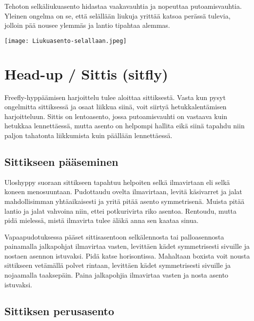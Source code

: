 Tehoton selkäliukuasento hidastaa vaakavauhtia ja nopeuttaa putoamisvauhtia. Yleinen ongelma on se, että selällään liukuja yrittää katsoa perässä tulevia, jolloin pää nousee ylemmäs ja lantio tipahtaa alemmas. 


\begin{Figure}\centering\texttt{[image: Liukuasento-selallaan.jpeg]}\end{Figure} 

\section{ Head-up / Sittis (sitfly) }
\label{freefly-lentoasennot-head-up-sittis-sitfly}


Freefly-hyppäämisen harjoittelu tulee aloittaa sittiksestä. Vasta kun pysyt ongelmitta sittiksessä ja osaat liikkua siinä, voit siirtyä hetukkalentämisen harjoitteluun. Sittis on lentoasento, jossa putoamisvauhti on vastaava kuin hetukkaa lennettäessä, mutta asento on helpompi hallita eikä siinä tapahdu niin paljon tahatonta liikkumista kuin päällään lennettäessä. 

\subsection{ Sittikseen pääseminen }
\label{freefly-lentoasennot-sittikseen-paaseminen}


Uloshyppy suoraan sittikseen tapahtuu helpoiten selkä ilmavirtaan eli selkä koneen menosuuntaan. Pudottaudu ovelta ilmavirtaan, levitä käsivarret ja jalat mahdollisimman yhtäaikaisesti ja yritä pitää asento symmetrisenä. Muista pitää lantio ja jalat vahvoina niin, ettei potkurivirta riko asentoa. Rentoudu, mutta pidä mielessä, mistä ilmavirta tulee äläkä anna sen kaataa sinua. 


Vapaapudotuksessa pääset sittisasentoon selkälennosta tai palloasennosta painamalla jalkapohjat ilmavirtaa vasten, levittäen kädet symmetrisesti sivuille ja nostaen asennon istuvaksi. Pidä katse horisontissa. Mahaltaan boxista voit nousta sittikseen vetämällä polvet rintaan, levittäen kädet symmetrisesti sivuille ja nojaamalla taaksepäin. Paina jalkapohjia ilmavirtaa vasten ja nosta asento istuvaksi. 

\subsection{ Sittiksen perusasento }
\label{freefly-lentoasennot-sittiksen-perusasento}


